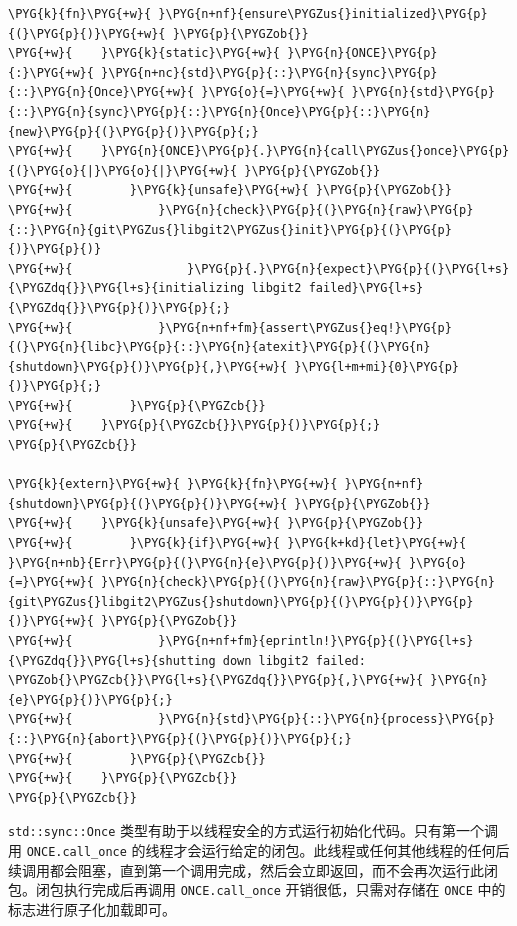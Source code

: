 \begin{Verbatim}[commandchars=\\\{\},breaklines=true,breakanywhere=true,fontsize=\codefont,xleftmargin=17bp]
\PYG{k}{fn}\PYG{+w}{ }\PYG{n+nf}{ensure\PYGZus{}initialized}\PYG{p}{(}\PYG{p}{)}\PYG{+w}{ }\PYG{p}{\PYGZob{}}
\PYG{+w}{    }\PYG{k}{static}\PYG{+w}{ }\PYG{n}{ONCE}\PYG{p}{:}\PYG{+w}{ }\PYG{n+nc}{std}\PYG{p}{::}\PYG{n}{sync}\PYG{p}{::}\PYG{n}{Once}\PYG{+w}{ }\PYG{o}{=}\PYG{+w}{ }\PYG{n}{std}\PYG{p}{::}\PYG{n}{sync}\PYG{p}{::}\PYG{n}{Once}\PYG{p}{::}\PYG{n}{new}\PYG{p}{(}\PYG{p}{)}\PYG{p}{;}
\PYG{+w}{    }\PYG{n}{ONCE}\PYG{p}{.}\PYG{n}{call\PYGZus{}once}\PYG{p}{(}\PYG{o}{|}\PYG{o}{|}\PYG{+w}{ }\PYG{p}{\PYGZob{}}
\PYG{+w}{        }\PYG{k}{unsafe}\PYG{+w}{ }\PYG{p}{\PYGZob{}}
\PYG{+w}{            }\PYG{n}{check}\PYG{p}{(}\PYG{n}{raw}\PYG{p}{::}\PYG{n}{git\PYGZus{}libgit2\PYGZus{}init}\PYG{p}{(}\PYG{p}{)}\PYG{p}{)}
\PYG{+w}{                }\PYG{p}{.}\PYG{n}{expect}\PYG{p}{(}\PYG{l+s}{\PYGZdq{}}\PYG{l+s}{initializing libgit2 failed}\PYG{l+s}{\PYGZdq{}}\PYG{p}{)}\PYG{p}{;}
\PYG{+w}{            }\PYG{n+nf+fm}{assert\PYGZus{}eq!}\PYG{p}{(}\PYG{n}{libc}\PYG{p}{::}\PYG{n}{atexit}\PYG{p}{(}\PYG{n}{shutdown}\PYG{p}{)}\PYG{p}{,}\PYG{+w}{ }\PYG{l+m+mi}{0}\PYG{p}{)}\PYG{p}{;}
\PYG{+w}{        }\PYG{p}{\PYGZcb{}}
\PYG{+w}{    }\PYG{p}{\PYGZcb{}}\PYG{p}{)}\PYG{p}{;}
\PYG{p}{\PYGZcb{}}

\PYG{k}{extern}\PYG{+w}{ }\PYG{k}{fn}\PYG{+w}{ }\PYG{n+nf}{shutdown}\PYG{p}{(}\PYG{p}{)}\PYG{+w}{ }\PYG{p}{\PYGZob{}}
\PYG{+w}{    }\PYG{k}{unsafe}\PYG{+w}{ }\PYG{p}{\PYGZob{}}
\PYG{+w}{        }\PYG{k}{if}\PYG{+w}{ }\PYG{k+kd}{let}\PYG{+w}{ }\PYG{n+nb}{Err}\PYG{p}{(}\PYG{n}{e}\PYG{p}{)}\PYG{+w}{ }\PYG{o}{=}\PYG{+w}{ }\PYG{n}{check}\PYG{p}{(}\PYG{n}{raw}\PYG{p}{::}\PYG{n}{git\PYGZus{}libgit2\PYGZus{}shutdown}\PYG{p}{(}\PYG{p}{)}\PYG{p}{)}\PYG{+w}{ }\PYG{p}{\PYGZob{}}
\PYG{+w}{            }\PYG{n+nf+fm}{eprintln!}\PYG{p}{(}\PYG{l+s}{\PYGZdq{}}\PYG{l+s}{shutting down libgit2 failed: \PYGZob{}\PYGZcb{}}\PYG{l+s}{\PYGZdq{}}\PYG{p}{,}\PYG{+w}{ }\PYG{n}{e}\PYG{p}{)}\PYG{p}{;}
\PYG{+w}{            }\PYG{n}{std}\PYG{p}{::}\PYG{n}{process}\PYG{p}{::}\PYG{n}{abort}\PYG{p}{(}\PYG{p}{)}\PYG{p}{;}
\PYG{+w}{        }\PYG{p}{\PYGZcb{}}
\PYG{+w}{    }\PYG{p}{\PYGZcb{}}
\PYG{p}{\PYGZcb{}}
\end{Verbatim}

\texttt{std::sync::Once} 类型有助于以线程安全的方式运行初始化代码。只有第一个调用 \texttt{ONCE.call\_once} 的线程才会运行给定的闭包。此线程或任何其他线程的任何后续调用都会阻塞，直到第一个调用完成，然后会立即返回，而不会再次运行此闭包。闭包执行完成后再调用 \texttt{ONCE.call\_once} 开销很低，只需对存储在 \texttt{ONCE} 中的标志进行原子化加载即可。

